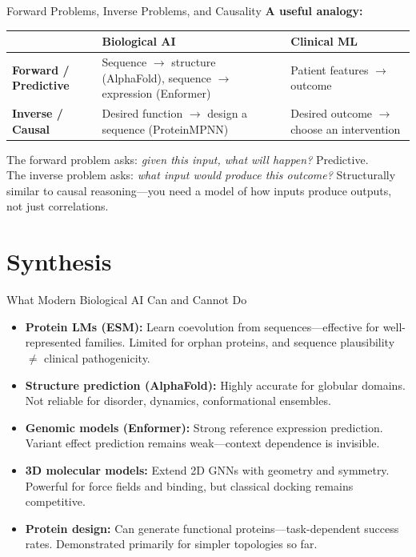 \documentclass[aspectratio=169,10pt]{beamer}
\begin{document}
\begin{frame}{Forward Problems, Inverse Problems, and Causality}
\textbf{A useful analogy:}

\vspace{0.3em}
\begin{center}
\renewcommand{\arraystretch}{1.4}
{\small
\begin{tabular}{p{3.5cm}p{5cm}p{3.5cm}}
\toprule
& \textbf{Biological AI} & \textbf{Clinical ML} \\
\midrule
\textbf{Forward / Predictive} & Sequence $\to$ structure (AlphaFold), sequence $\to$ expression (Enformer) & Patient features $\to$ outcome \\
\textbf{Inverse / Causal} & Desired function $\to$ design a sequence (ProteinMPNN) & Desired outcome $\to$ choose an intervention \\
\bottomrule
\end{tabular}}
\end{center}

\vspace{0.2em}
The forward problem asks: \emph{given this input, what will happen?} Predictive.\\
The inverse problem asks: \emph{what input would produce this outcome?} Structurally similar to causal reasoning---you need a model of how inputs produce outputs, not just correlations.
\end{frame}

\section{Synthesis}

\begin{frame}{What Modern Biological AI Can and Cannot Do}
\begin{itemize}[<+->]
    \item \textbf{Protein LMs (ESM):} Learn coevolution from sequences---effective for well-represented families. Limited for orphan proteins, and sequence plausibility $\neq$ clinical pathogenicity.
    \item \textbf{Structure prediction (AlphaFold):} Highly accurate for globular domains. Not reliable for disorder, dynamics, conformational ensembles.
    \item \textbf{Genomic models (Enformer):} Strong reference expression prediction. Variant effect prediction remains weak---context dependence is invisible.
    \item \textbf{3D molecular models:} Extend 2D GNNs with geometry and symmetry. Powerful for force fields and binding, but classical docking remains competitive.
    \item \textbf{Protein design:} Can generate functional proteins---task-dependent success rates. Demonstrated primarily for simpler topologies so far.
\end{itemize}
\end{frame}
\end{document}

